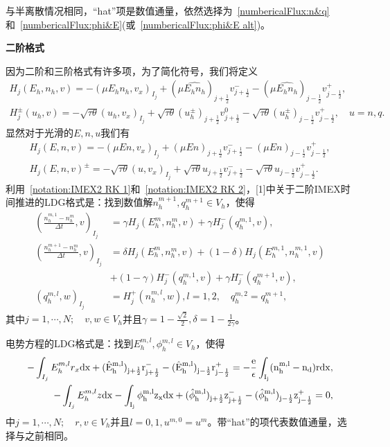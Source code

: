 与半离散情况相同，“hat”项是数值通量，依然选择为~\eqref{numbericalFlux:n&q}和~\eqref{numbericalFlux:phi&E}(或~\eqref{numbericalFlux:phi&E alt})。

\noindent \textbf{二阶格式}

因为二阶和三阶格式有许多项，为了简化符号，我们将定义
\begin{align}
    H_j(E_h,n_h,v) = - (\mu E_h n_h, v_x)_{I_j} + (\mu \hat{E_h n_h})_{j+\frac{1}{2}}v_{j+\frac{1}{2}}^- - (\mu \hat{E_h n_h})_{j-\frac{1}{2}}v_{j-\frac{1}{2}}^+, \label{notation:IMEX2 RK 1} \\
    H_j^{\pm}(u_h,v) =- \sqrt{\tau \theta}(u_h,v_x)_{I_j} + \sqrt{\tau\theta}(u_h^{\pm})_{j+\frac{1}{2}}v_{j+\frac{1}{2}}^0 - \sqrt{\tau\theta}(u_h^{\pm})_{j-\frac{1}{2}}v_{j-\frac{1}{2}}^+,\quad u = n,q.\label{notation:IMEX2 RK 2}
\end{align}
显然对于光滑的$E,n,u$我们有
\begin{align*}
    H_j(E,n,v) = -(\mu En,v_x)_{I_j} + (\mu En)_{j+\frac{1}{2}}v_{j+\frac{1}{2}}^- - (\mu En)_{j-\frac{1}{2}}v_{j-\frac{1}{2}}^+, \\
    H_j(E,n,v)^{\pm} = - \sqrt{\tau\theta}(u,v_x)_{I_j} + \sqrt{\tau\theta}u_{j+\frac{1}{2}}v_{j+\frac{1}{2}}^- - \sqrt{\tau\theta}u_{j-\frac{1}{2}}v_{j-\frac{1}{2}}^+.
\end{align*}
利用~\eqref{notation:IMEX2 RK 1}和~\eqref{notation:IMEX2 RK 2}，[1]中关于二阶IMEX时间推进的LDG格式是：找到数值解$n_h^{m+1},q_h^{m+1}\in V_h$，使得
\begin{align}
    (\frac{n_h^{m,1} -n_h^m}{\Delta t},v)_{I_j} & = \gamma H_j(E_h^m,n_h^m,v) + \gamma H_j^-(q_h^{m,1},v),                     \label{weakForm:IMEX2 LDG 1} \\
    (\frac{n_h^{m+1} -n_h^m}{\Delta t},v)_{I_j} & = \delta H_j(E_h^m,n_h^m,v) + (1-\delta)H_j(E_h^{m,1},n_h^{m,1},v) \nonumber                              \\
                                                & +(1-\gamma)H_j^-(q_h^{m,1},v) + \gamma H_j^-(q_h^{m+1},v),                                                \\
    (q_h^{m,l},w)_{I_j}                         & = H_j^+(n_h^{m,l},w), l = 1,2, \quad q_h^{m,2} = q_h^{m+1},\label{weakForm:IMEX2 LDG 3}
\end{align}
其中$j = 1,\cdots,N;\quad v,w \in V_h$并且$\gamma = 1- \frac{\sqrt{2}}{2},\delta = 1 - \frac{1}{2\gamma}$。

电势方程的LDG格式是：找到$E_h^{m,l},\phi_h^{m,l} \in V_h$，使得
\begin{align}
    -\int_{I_j} E_h^{m,l}r_x \rm{d}x + (\hat{E}_h^{m,l})_{j+\frac{1}{2}}r_{j+\frac{1}{2}}^- - (\hat{E}_h^{m,l})_{j-\frac{1}{2}}r_{j-\frac{1}{2}}^+ = -\frac{e}{\epsilon}\int_{I_j}(n_h^{m,l} - n_d) r\rm{d} x, \label{equation:IMEX2 LDG:EPE 1} \\
    -\int_{I_j} E_h^{m,l}z \rm{d}x - \int_{I_j} \phi_h^{m,l}z_x \rm{d}x  + (\hat{\phi}_h^{m,l})_{j+\frac{1}{2}}z^-_{j+\frac{1}{2}} - (\hat{\phi}_h^{m,l})_{j-\frac{1}{2}}z_{j-\frac{1}{2}}^+  = 0, \label{equation:IMEX2 LDG:EPE 2}
\end{align}
中$j = 1,\cdots,N;\quad r,v \in V_h$并且$l = 0,1, u^{m,0} = u^m$。带“hat”的项代表数值通量，选择与之前相同。


